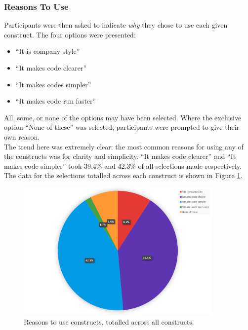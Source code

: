\documentclass{article}
\begin{document}
        \subsubsection{Reasons To Use}
            Participants were then asked to indicate \emph{why} they chose to use each given construct. The four options were presented:
            \begin{itemize}
                \item ``It is company style''
                \item ``It makes code clearer''
                \item ``It makes codes simpler''
                \item ``It makes code run faster''
            \end{itemize}
            All, some, or none of the options may have been selected. Where the exclusive option ``None of these'' was selected, participants were prompted to give their own reason.
            \\

            The trend here was extremely clear: the most common reasons for using any of the constructs was for clarity and simplicity. ``It makes code clearer'' and ``It makes code simpler'' took 39.4\% and 42.3\% of all selections made respectively. The data for the selections totalled across each construct is shown in Figure \ref{fig:toUsePie}.

            \begin{figure}[htbp]
                \centering
                \includegraphics[width=0.9\textwidth]{toUsePie}
                \caption{Reasons to use constructs, totalled across all constructs.}
                \label{fig:toUsePie}
            \end{figure}
\end{document}
